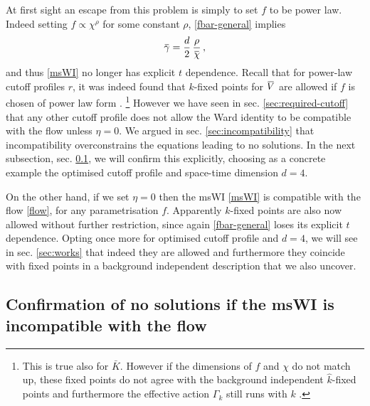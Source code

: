 \documentclass[11pt]{book}
\newcommand{\overbar}[1]{\mkern 1.5mu\overline{\mkern-1.5mu#1\mkern-1.5mu}\mkern 1.5mu}
\newcommand{\bV}{\overbar V}
\newcommand{\bg}{\overbar \gamma}
\newcommand{\bc}{\overbar \chi}
\numberwithin{equation}{chapter}
\begin{document}
At first sight an escape from this problem is simply to set $f$ to be power law.
Indeed setting $f\propto\chi^{\rho}$ for some constant $\rho$, \eqref{fbar-general} implies
\begin{align}
  \bg = \frac{d}{2} \, \frac{\rho}{\bc}\,,
  \label{powlaw-gamma}
\end{align}
and thus \eqref{msWI} no longer has explicit $t$ dependence.
Recall that for power-law cutoff profiles $r$, it was indeed found that $k$-fixed points for $\bV$
are allowed if $f$ is chosen of power law form \cite{Dietz:2015owa}.%
\footnote{This is true also for $\bar{K}$. However if the dimensions of $f$ and $\chi$ do not match up,
  these fixed points do not agree with the background independent $\hat{k}$-fixed points and furthermore
the effective action $\Gamma_k$ still runs with $k$ \cite{Dietz:2015owa}.}
However we have seen in sec. \ref{sec:required-cutoff} that any other cutoff profile does
not allow the Ward identity to be compatible with the flow unless $\eta=0$.
We argued in sec. \ref{sec:incompatibility} that incompatibility overconstrains the equations
leading to no solutions. In the next subsection, sec. \ref{sec:incompatible-no-solns},
we will confirm this explicitly, choosing as a concrete example the optimised cutoff profile and
space-time dimension $d=4$.

On the other hand, if we set $\eta=0$ then the msWI \eqref{msWI} is compatible with the flow \eqref{flow},
for any parametrisation $f$. Apparently $k$-fixed points are also now allowed without further restriction,
since again \eqref{fbar-general} loses its explicit $t$ dependence.
Opting once more for optimised cutoff profile and $d=4$, we will see in sec. \ref{sec:works} that
indeed they are allowed and furthermore they coincide with fixed points in a background independent
description that we also uncover.


\subsection{Confirmation of no solutions if the msWI is incompatible with the flow}
\label{sec:incompatible-no-solns}
\end{document}
